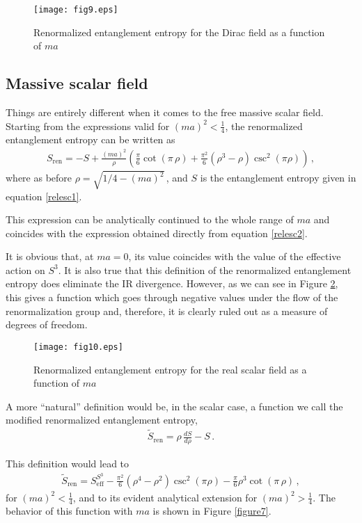 \documentclass[12pt,a4paper]{article}
\newcommand{\beq}{\begin{eqnarray}}
\newcommand{\eeq}{\end{eqnarray}}
\numberwithin{equation}{section}
\begin{document}
\begin{figure}[h]
\centering
\texttt{[image: fig9.eps]}
\caption{\small Renormalized entanglement entropy for the Dirac field as a function of $ma$}
\label{figure5}
\end{figure}

\subsection{Massive scalar field}

Things are entirely different when it comes to the free massive scalar field. Starting from the expressions valid for $(ma)^2<\frac14$, the renormalized entanglement entropy can be written as
\beq
S_{\mathrm{ren}}=-S+\frac{(ma)^2}{\rho}\left(\frac{\pi}{6}\cot{(\pi\,\rho)}+\frac{{\pi}^2}{6}({\rho}^3 -\rho)\csc^2{(\pi \rho)}\right)\,,
\eeq
where as before $\rho=\sqrt{1/4-(ma)^2}$\,, and $S$ is the entanglement entropy given in equation \eqref{relesc1}.

This expression can be analytically continued to the whole range of $ma$ and coincides with the expression obtained directly from equation \ref{relesc2}.

It is obvious that, at $ma=0$, its value coincides with the value of the effective action on $S^3$. It is also true that this definition of the renormalized entanglement entropy does eliminate the IR divergence. However, as we can see in Figure \ref{figure6}, this gives a function which goes through negative values under the flow of the renormalization group and, therefore, it is clearly ruled out as a measure of degrees of freedom.

\begin{figure}[h]
\centering
\texttt{[image: fig10.eps]}
\caption{\small Renormalized entanglement entropy for the real scalar field as a function of $ma$}
\label{figure6}
\end{figure}

A more ``natural'' definition would be, in the scalar case, a function we call the modified renormalized entanglement entropy,
\beq
{\tilde{S}}_{\mathrm{ren}}=\rho\,\frac{d S}{d\rho}-S\,.
\eeq

This definition would lead to
\beq
{\tilde{S}}_{\mathrm{ren}}=S_{\mathrm{eff}}^{S^3}-\frac{{\pi}^2}{6}({\rho}^4 -{\rho}^2)\csc^2{(\pi \rho)}-\frac{\pi}{6}{\rho}^3\cot{(\pi\,\rho)}\,,\eeq
for $(ma)^2<\frac14$, and to its evident analytical extension for $(ma)^2>\frac14$. The behavior of this function with $ma$ is shown in Figure \ref{figure7}.
\end{document}
